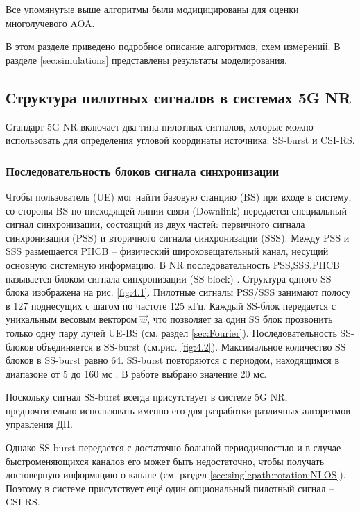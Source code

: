 Все упомянутые выше алгоритмы были модицицированы для оценки многолучевого AOA.

В этом разделе приведено подробное описание алгоритмов, схем измерений. В
разделе \ref{sec:simulations} представлены результаты моделирования.


\subsection{Структура пилотных сигналов в системах 5G NR}
\label{sec:ssburst}

Стандарт 5G NR включает два типа пилотных сигналов, которые можно использовать для определения угловой координаты источника: SS-burst
и CSI-RS.

\subsubsection{Последовательность блоков сигнала синхронизации}

Чтобы пользователь (UE) мог найти базовую станцию (BS) при входе в систему, со
стороны BS по нисходящей линии связи (Downlink) передается специальный сигнал
синхронизации, состоящий из двух частей: первичного сигнала синхронизации (PSS)
и вторичного сигнала синхронизации (SSS). Между PSS и SSS размещается PHCB --
физический широковещательный канал, несущий основную системную информацию. В NR 
последовательность PSS,SSS,PHCB называется блоком сигнала синхронизации (SS
block) \cite{Dahlman2018}. Структура одного SS блока изображена на рис. \ref{fig:4.1}. 
Пилотные сигналы PSS/SSS занимают полосу в 127 поднесущих с шагом по частоте 125 кГц. 
Каждый SS-блок передается с уникальным весовым вектором $\vec w$, что 
позволяет за один SS блок прозвонить только одну пару лучей UE-BS (см. раздел \ref{sec:Fourier}).  
Последовательность SS-блоков объединяется в SS-burst (см.рис. \ref{fig:4.2}).  
Максимальное количество SS блоков в SS-burst равно 64. 
SS-burst повторяются с периодом, находящимся  в диапазоне от 5 до 160 мс \cite{Dahlman2018}.  
В работе выбрано значение 20 мс.

Поскольку сигнал SS-burst всегда присутствует в системе 5G NR, предпочтительно 
использовать именно его для разработки различных алгоритмов управления ДН. 

Однако SS-burst передается с достаточно большой периодичностью и в случае 
быстроменяющихся каналов его может быть недостаточно, чтобы получать достоверную
информацию о канале (см. раздел \ref{sec:singlepath:rotation:NLOS}). Поэтому в 
системе присутствует ещё один опциональный пилотный сигнал -- CSI-RS.


